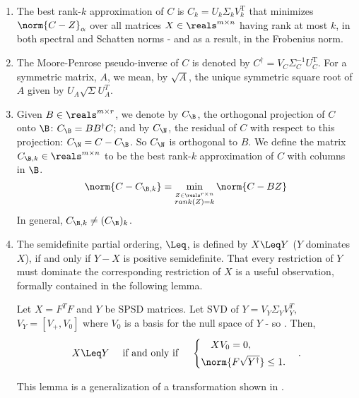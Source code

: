 \begin{enumerate}
\item The best rank-$k$ approximation of $C$ is $C_k = U_k\Sigma_kV_k^{\text{T}}$ that minimizes $\norm{C - Z}_{\alpha}$ over all matrices $X \in \reals^{m \times n}$ having rank at most $k$, in both spectral and Schatten norms - and as a result, in the Frobenius norm. 

\item The Moore-Penrose pseudo-inverse of $C$ is denoted by $C^{\dagger} = V_C\Sigma_C^{-1}U_C^{\text{T}}$. For a symmetric matrix, $A$, we mean, by $\sqrt{A}$, the unique symmetric square root of $A$ given by $U_A \sqrt{\Sigma} U_A ^T$. 

\item Given $B \in \reals^{m \times r}$, we denote by $C_{\B}$, the orthogonal projection of $C$ onto $\B$: $C_{\B} = BB^{\dagger}C$; and by $C_{\N}$, the residual of $C$ with respect to this projection: $C_{\N} = C - C_{\B}$. So $C_{\N}$ is orthogonal to $B$. 
We define the matrix $C_{\B,k} \in \reals^{m \times n}$ to be the best rank-$k$ approximation of ${C}$ with columns in $\B$. 
\[\norm{C - C_{\B,k}} = \min_{\stackrel{Z \in \reals^{r \times n}}{rank(Z) = k}} \norm{C - BZ}\]
In general, $C_{\B,k} \neq (C_{\B})_k$. 

\item The semidefinite partial ordering, $\Leq$, is defined by $X \Leq Y$ ($Y$ dominates $X$), if and only if $Y - X$ is positive semidefinite. That every restriction of $Y$ must dominate the corresponding restriction of $X$ is a useful observation, formally contained in the following lemma.
\begin{lemma}\label{basic lemma}
Let $X = F^TF$ and  $Y$ be SPSD matrices. Let SVD of $Y = V_Y\Sigma_Y V_Y^T,$ $V_Y = [V_+, V_0]$ where $V_0$ is a basis for the null space of 
$Y$ - so . Then, 
\[X \Leq Y \quad \text{  if and only if } \quad
\begin{cases}
\quad XV_0 = 0, \\[3pt]
\norm{F \sqrt{Y^{\dagger}} } \leq 1.
\end{cases}.
\]
\end{lemma}
\noindent This lemma is a generalization of a transformation shown in \cite{SR}.
\end{enumerate}
